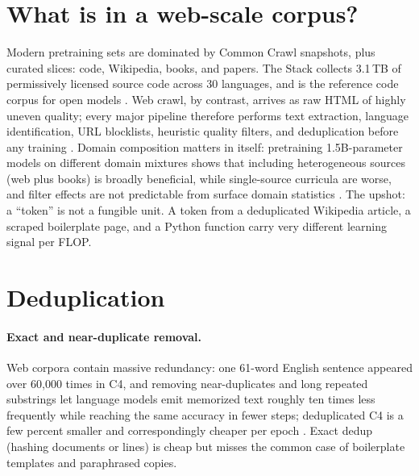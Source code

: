 \documentclass[11pt]{article}
\begin{document}
\section{What is in a web-scale corpus?}
Modern pretraining sets are dominated by Common Crawl snapshots, plus curated slices: code, Wikipedia, books, and papers. The Stack collects 3.1\,TB of permissively licensed source code across 30 languages, and is the reference code corpus for open models \cite{kocetkov2022stack}. Web crawl, by contrast, arrives as raw HTML of highly uneven quality; every major pipeline therefore performs text extraction, language identification, URL blocklists, heuristic quality filters, and deduplication before any training \cite{penedo2024fineweb}. Domain composition matters in itself: pretraining 1.5B-parameter models on different domain mixtures shows that including heterogeneous sources (web plus books) is broadly beneficial, while single-source curricula are worse, and filter effects are not predictable from surface domain statistics \cite{longpre2023pretrainer}. The upshot: a ``token'' is not a fungible unit. A token from a deduplicated Wikipedia article, a scraped boilerplate page, and a Python function carry very different learning signal per FLOP.

\section{Deduplication}
\paragraph{Exact and near-duplicate removal.} Web corpora contain massive redundancy: one 61-word English sentence appeared over 60{,}000 times in C4, and removing near-duplicates and long repeated substrings let language models emit memorized text roughly ten times less frequently while reaching the same accuracy in fewer steps; deduplicated C4 is a few percent smaller and correspondingly cheaper per epoch \cite{lee2022deduplicating}. Exact dedup (hashing documents or lines) is cheap but misses the common case of boilerplate templates and paraphrased copies.
\end{document}
